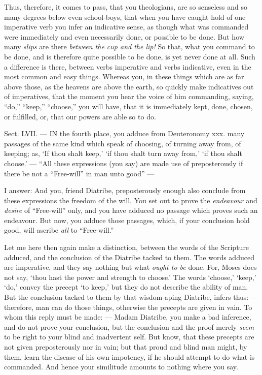 Thus, therefore, it comes to pass, that you theologians, are so senseless and so many degrees below even school-boys, that when you have caught hold of one imperative verb you infer an indicative sense, as though what was commanded were immediately and even necessarily done, or possible to be done. But how many \emph{slips }are there \emph{between the cup and the lip! }So that, what you command to be done, and is therefore quite possible to be done, is yet never done at all. Such a difference is there, between verbs imperative and verbs indicative, even in the most common and easy things. Whereas you, in these things which are as far above those, as the heavens are above the earth, so quickly make indicatives out of imperatives, that the moment you hear the voice of him commanding, saying, “do,” “keep,” “choose,” you will have, that it is immediately kept, done, chosen, or fulfilled, or, that our powers are able so to do.


Sect. LVII. — IN the fourth place, you adduce from Deuteronomy xxx. many passages of the same kind which speak of choosing, of turning away from, of keeping; as, ‘If thou shalt keep,’ ‘if thou shalt turn away from,’ ‘if thou shalt choose.’ — “All these expressions (you say) are made use of preposterously if there be not a “Free-will” in man unto good” —

I answer: And you, friend Diatribe, preposterously enough also conclude from these expressions the freedom of the will. You set out to prove the \emph{endeavour }and \emph{desire }of “Free-will” only, and you have adduced no passage which proves such an endeavour. But now, you adduce those passages, which, if your conclusion hold good, will ascribe \emph{all }to “Free-will.”

Let me here then again make a distinction, between the words of the Scripture adduced, and the conclusion of the Diatribe tacked to them. The words adduced are imperative, and they say nothing but what \emph{ought to be }done. For, Moses does not say, ‘thou hast the power and strength to choose.’ The words ‘choose,’ ‘keep,’ ‘do,’ convey the precept ‘to keep,’ but they do not describe the ability of man. But the conclusion tacked to them by that wisdom-aping Diatribe, infers thus: — therefore, man can do those things, otherwise the precepts are given in vain. To whom this reply must be made: — Madam Diatribe, you make a bad inference, and do not prove your conclusion, but the conclusion and the proof merely \emph{ seem }to be right to your blind and inadvertent self. But know, that these precepts are not given preposterously nor in vain; but that proud and blind man might, by them, learn the disease of his own impotency, if he should attempt to do what is commanded. And hence your similitude amounts to nothing where you say.

